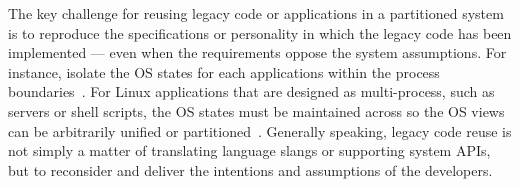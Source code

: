 
The key challenge for reusing legacy code or applications in a partitioned system
is to reproduce the specifications or personality in which the legacy code has been implemented
--- even when the requirements oppose the system assumptions.
For instance,
\picoprocs{} isolate the OS states for each applications
within the process boundaries~\citep{porter11drawbridge, baumann13bascule, baumann14haven}.
For Linux applications that are designed as multi-process,
such as servers or shell scripts,
the OS states must be maintained across \picoprocs{}
so the OS views can be arbitrarily unified or partitioned~\citep{tsai14graphene}.
Generally speaking,
legacy code reuse is not simply a matter of translating language slangs or supporting system APIs,
but to reconsider and deliver the intentions and assumptions of the developers.

